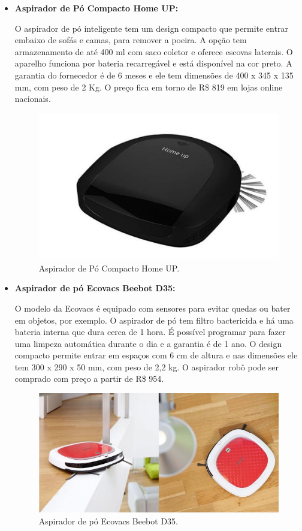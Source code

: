 	\begin{itemize}
		\item \textbf{Aspirador de Pó Compacto Home UP:}

			O aspirador de pó inteligente tem um design compacto que permite entrar embaixo de sofás e camas, para remover a poeira. A opção tem armazenamento de até 400 ml com saco coletor e oferece escovas laterais. O aparelho funciona por bateria recarregável e está disponível na cor preto. A garantia do fornecedor é de 6 meses e ele tem dimensões de 400 x 345 x 135 mm, com peso de 2 Kg. O preço fica em torno de R\$ 819 em lojas online nacionais.

			\begin{figure}[H]
				\centering
				\includegraphics[scale=0.55]{figuras/pm_home_up.png}
				\caption{Aspirador de Pó Compacto Home UP.}
				\label{img:pm_home_up}
			\end{figure}

		\item \textbf{Aspirador de pó Ecovacs Beebot D35:}

			 O modelo da Ecovacs é equipado com sensores para evitar quedas ou bater em objetos, por exemplo. O aspirador de pó tem filtro bactericida e há uma bateria interna que dura cerca de 1 hora. É possível programar para fazer uma limpeza automática durante o dia e a garantia é de 1 ano. O design compacto permite entrar em espaços com 6 cm de altura e nas dimensões ele tem 300 x 290 x 50 mm, com peso de 2,2 kg. O aspirador robô pode ser comprado com preço a partir de R\$ 954.

			\begin{figure}[H]
				\centering
				\includegraphics[scale=0.55]{figuras/pm_beebot_d35.png}
				\caption{Aspirador de pó Ecovacs Beebot D35.}
				\label{img:pm_beebot_d35}
			\end{figure}



\end{itemize}
